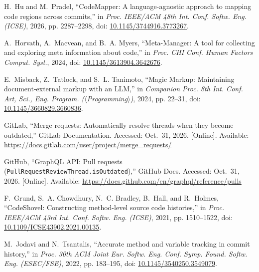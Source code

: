 H.~Hu and M.~Pradel, ``CodeMapper: A language-agnostic approach to mapping code regions across commits,'' in \emph{Proc. IEEE/ACM 48th Int. Conf. Softw. Eng. (ICSE)}, 2026, pp. 2287--2298, doi: \href{https://doi.org/10.1145/3744916.3773267}{10.1145/3744916.3773267}.

A.~Horvath, A.~Macvean, and B.~A. Myers, ``Meta-Manager: A tool for collecting and exploring meta information about code,'' in \emph{Proc. CHI Conf. Human Factors Comput. Syst.}, 2024, doi: \href{https://doi.org/10.1145/3613904.3642676}{10.1145/3613904.3642676}.

E.~Misback, Z.~Tatlock, and S.~L. Tanimoto, ``Magic Markup: Maintaining document-external markup with an LLM,'' in \emph{Companion Proc. 8th Int. Conf. Art, Sci., Eng. Program. ($\langle$Programming$\rangle$)}, 2024, pp. 22--31, doi: \href{https://doi.org/10.1145/3660829.3660836}{10.1145/3660829.3660836}.

GitLab, ``Merge requests: Automatically resolve threads when they become outdated,'' GitLab Documentation. Accessed: Oct.~31, 2026. [Online]. Available: \url{https://docs.gitlab.com/user/project/merge_requests/}

GitHub, ``GraphQL API: Pull requests (\texttt{PullRequestReviewThread.isOutdated}),'' GitHub Docs. Accessed: Oct.~31, 2026. [Online]. Available: \url{https://docs.github.com/en/graphql/reference/pulls}

F.~Grund, S.~A. Chowdhury, N.~C. Bradley, B.~Hall, and R.~Holmes, ``CodeShovel: Constructing method-level source code histories,'' in \emph{Proc. IEEE/ACM 43rd Int. Conf. Softw. Eng. (ICSE)}, 2021, pp. 1510--1522, doi: \href{https://doi.org/10.1109/ICSE43902.2021.00135}{10.1109/ICSE43902.2021.00135}.

M.~Jodavi and N.~Tsantalis, ``Accurate method and variable tracking in commit history,'' in \emph{Proc. 30th ACM Joint Eur. Softw. Eng. Conf. Symp. Found. Softw. Eng. (ESEC/FSE)}, 2022, pp. 183--195, doi: \href{https://doi.org/10.1145/3540250.3549079}{10.1145/3540250.3549079}.

